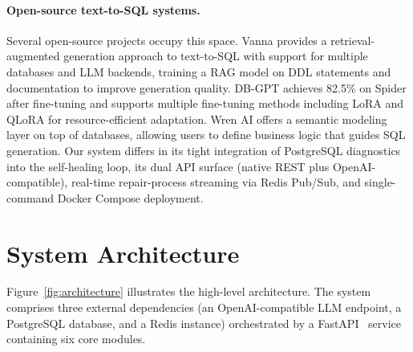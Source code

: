 \documentclass{article}
\begin{document}
\paragraph{Open-source text-to-SQL systems.}
Several open-source projects occupy this space. Vanna provides a retrieval-augmented generation approach to text-to-SQL with support for multiple databases and LLM backends, training a RAG model on DDL statements and documentation to improve generation quality. DB-GPT achieves 82.5\% on Spider after fine-tuning and supports multiple fine-tuning methods including LoRA and QLoRA for resource-efficient adaptation. Wren AI offers a semantic modeling layer on top of databases, allowing users to define business logic that guides SQL generation. Our system differs in its tight integration of PostgreSQL diagnostics into the self-healing loop, its dual API surface (native REST plus OpenAI-compatible), real-time repair-process streaming via Redis Pub/Sub, and single-command Docker Compose deployment.


\section{System Architecture}
\label{sec:architecture}

Figure~\ref{fig:architecture} illustrates the high-level architecture. The system comprises three external dependencies (an OpenAI-compatible LLM endpoint, a PostgreSQL database, and a Redis instance) orchestrated by a FastAPI~\citep{fastapi2018} service containing six core modules.
\end{document}
